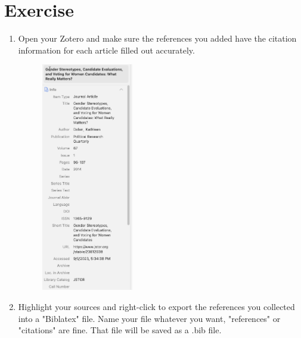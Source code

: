 \documentclass{article}
\begin{document}
\section*{Exercise}
\begin{enumerate}
    \item Open your Zotero and make sure the references you added have the citation information for each article filled out accurately.
    \begin{figure} [H]
        \centering %
        \includegraphics[width = 4cm]{dolan_info.png} 
\end{figure}

\newpage
    \item Highlight your sources and right-click to export the references you collected into a "Biblatex" file. Name your file whatever you want, "references" or "citations" are fine. That file will be saved as a .bib file. 


\end{enumerate}
\end{document}
